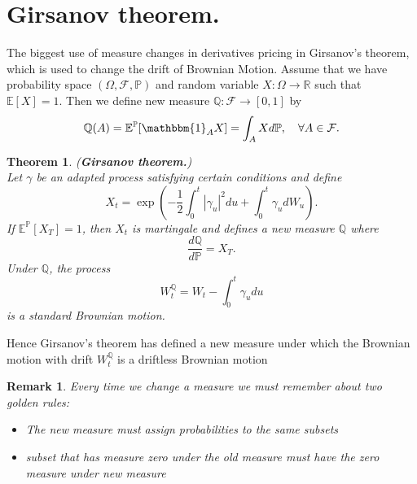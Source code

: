 \documentclass{book}
\newtheorem{theorem}{Theorem}[section]
\newtheorem{remark}{Remark}[section]
\begin{document}
\section{Girsanov theorem.}The biggest use of measure changes in derivatives pricing in Girsanov's theorem, which is used to change the drift of Brownian Motion.
Assume that we have probability space $(\varOmega,\mathcal{F},\mathbb{P})$ and random variable $X\colon\varOmega\to\mathbb{R}$ such that $\mathbb{E}[X]=1$. Then we define new measure $\mathbb{Q}\colon\mathcal{F}\to[0,1]$ by
$$
\mathbb{Q}(A)=\mathbb{E}^{\mathbb{P}}[\mathbbm{1}_{A}X]=\int_{A}Xd\mathbb{P},\quad \forall A\in\mathcal{F}.
$$
\begin{theorem}(\textbf{Girsanov theorem.})\\
Let $\gamma$ be an adapted process satisfying certain conditions and define
$$
X_{t}=\exp\left(-\frac{1}{2}\int_{0}^{t}|\gamma_{u}|^{2}du+\int_{0}^{t}\gamma_{u}dW_{u}\right).
$$
If $\mathbb{E}^{\mathbb{P}}[X_{T}]=1$, then $X_{t}$ is martingale and defines a new measure $\mathbb{Q}$ where
$$
\frac{d\mathbb{Q}}{d\mathbb{P}}=X_{T}.
$$
Under $\mathbb{Q}$, the process
$$
W_{t}^{\mathbb{Q}}=W_{t}-\int_{0}^{t}\gamma_{u}du
$$
is a standard Brownian motion.
\end{theorem}
Hence Girsanov's theorem has defined a new measure under which the Brownian motion with drift $W_{t}^{\mathbb{Q}}$ is a driftless Brownian motion
\begin{remark}
Every time we change a measure we must remember about two golden rules:
\begin{itemize}
\item The new measure must assign probabilities to the same subsets
\item subset that has measure zero under the old measure must have the zero measure under new measure
\end{itemize}
\end{remark}
\end{document}
